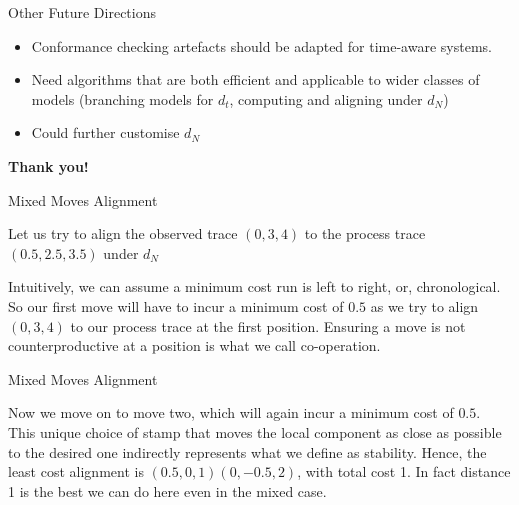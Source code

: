 \documentclass[10pt]{beamer}
\begin{document}
\begin{frame}{Other Future Directions}
    \begin{itemize}
    	\item Conformance checking artefacts  should be adapted for time-aware systems.
	\vfill 
	\item Need algorithms that are both efficient and applicable to wider classes of models (branching models for $d_t$, computing and aligning under $d_N$)
	\vfill 
	\item Could further customise $d_N$
\end{itemize}
\end{frame}

\begin{frame}
    \Huge{\centerline{\textbf{Thank you!}}}
\end{frame}



\begin{frame}{Mixed Moves Alignment}
	
	Let us try to align the observed trace $(0, 3, 4)$ to the process trace $(0.5, 2.5, 3.5)$ under $d_N$

\vfill 
Intuitively,  we can assume a minimum cost run is left to right, or, \alert{chronological}. 
\vfill 
So our first move will have to incur a minimum cost of $0.5$ as we try to align $(0,3,4)$ to our process trace at the first position.
\vfill 
Ensuring a move is not counterproductive at a position is what we call \alert{co-operation}. 


\end{frame} 

\begin{frame}{Mixed Moves Alignment}

	Now we move on to move two, which will again incur a minimum cost of $0.5$. 
	\vfill 
	This unique choice of stamp that moves the local component as close as possible to the desired one indirectly represents what we define as \alert{stability}. 
	\vfill 
	Hence, the least cost alignment is $(0.5, 0, 1)(0, -0.5, 2)$, with total cost 1. 
	\vfill 
	In fact distance 1 is the best we can do here even in the mixed case. 
\end{frame} 
\end{document}

